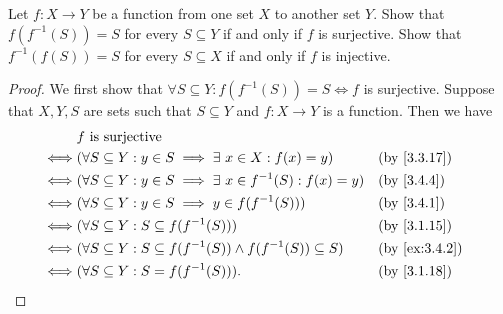 \begin{ex}\label{ex:3.4.5}
  Let \(f : X \to Y\) be a function from one set \(X\) to another set \(Y\).
  Show that \(f(f^{-1}(S)) = S\) for every \(S \subseteq Y\) if and only if \(f\) is surjective.
  Show that \(f^{-1}(f(S)) = S\) for every \(S \subseteq X\) if and only if \(f\) is injective.
\end{ex}

\begin{proof}
  We first show that \(\forall S \subseteq Y : f(f^{-1}(S)) = S \iff f\) is surjective.
  Suppose that \(X, Y, S\) are sets such that \(S \subseteq Y\) and \(f : X \to Y\) is a function.
  Then we have
  \begin{align*}
         & f \text{ is surjective}                                                                                            \\
    \iff & (\forall S \subseteq Y : y \in S \implies \exists\ x \in X : f(x) = y)            &  & \text{(by \cref{3.3.17})}   \\
    \iff & (\forall S \subseteq Y : y \in S \implies \exists\ x \in f^{-1}(S) : f(x) = y)    &  & \text{(by \cref{3.4.4})}    \\
    \iff & (\forall S \subseteq Y : y \in S \implies y \in f(f^{-1}(S)))                     &  & \text{(by \cref{3.4.1})}    \\
    \iff & (\forall S \subseteq Y : S \subseteq f(f^{-1}(S)))                                &  & \text{(by \cref{3.1.15})}   \\
    \iff & (\forall S \subseteq Y : S \subseteq f(f^{-1}(S)) \land f(f^{-1}(S)) \subseteq S) &  & \text{(by \cref{ex:3.4.2})} \\
    \iff & (\forall S \subseteq Y : S = f(f^{-1}(S))).                                       &  & \text{(by \cref{3.1.18})}
  \end{align*}


\end{proof}
